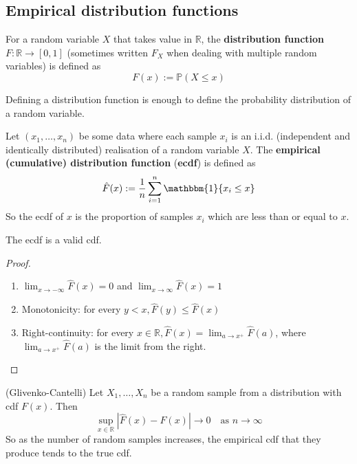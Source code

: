 \subsection{Empirical distribution functions}

\begin{definition}
	For a random variable $X$ that takes value in $\mathbb{R}$, the \textbf{distribution function} $F: \mathbb{R} \rightarrow [0, 1]$ (sometimes written $F_X$ when dealing with multiple random variables) is defined as
	\[
		F(x) := \mathbb{P}(X \le x)
	\]
\end{definition}

\begin{remark}
	Defining a distribution function is enough to define the probability distribution of a random variable.
\end{remark}

\begin{definition}
	Let $(x_1, \dots, x_n)$ be some data where each sample $x_i$ is an i.i.d. (independent and identically distributed) realisation of a random variable $X$. The \textbf{empirical (cumulative) distribution function} (\textbf{ecdf}) is defined as
	\[
		\hat{F}(x) := \frac{1}{n} \sum_{i = 1}^{n} \mathbbm{1} \{ x_i \le x \}
	\]
	So the ecdf of $x$ is the proportion of samples $x_i$ which are less than or equal to $x$.
\end{definition}

\begin{proposition}
	The ecdf is a valid cdf.
\end{proposition}

\begin{proof}
	\hfill
	\begin{enumerate}
		\item $\lim_{x \rightarrow -\infty} \hat{F}(x) = 0$ and $\lim_{x \rightarrow \infty} \hat{F}(x) = 1$
		\item Monotonicity: for every $y < x, \hat{F}(y) \le \hat{F}(x)$
		\item Right-continuity: for every $x \in \mathbb{R}, \hat{F}(x) = \lim_{a \rightarrow x^+}\hat{F}(a)$, where $\lim_{a \rightarrow x^+}\hat{F}(a)$ is the limit from the right.
	\end{enumerate}
\end{proof}

\begin{theorem}
	(Glivenko-Cantelli) Let $X_1, \dots, X_n$ be a random sample from a distribution with cdf $F(x)$. Then
	\[
		\sup_{x \in \mathbb{R}} | \hat{F}(x) - F(x) | \rightarrow 0 \quad \text{as } n \rightarrow \infty
	\]
	So as the number of random samples increases, the empirical cdf that they produce tends to the true cdf.
\end{theorem}

